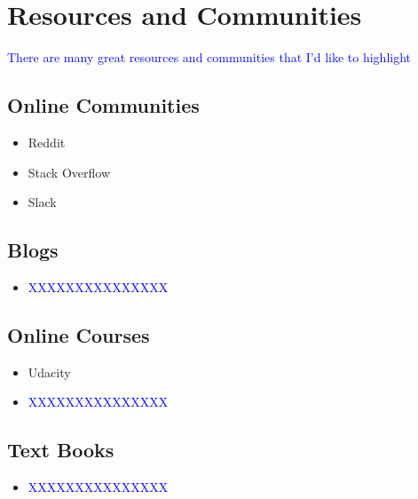 \chapter{Resources and Communities}

\textcolor{blue}{There are many great resources and communities that I'd like to highlight}


\section{Online Communities}

\begin{itemize}
	
	\item Reddit
	
	\item Stack Overflow
	
	\item Slack
\end{itemize}


\section{Blogs}

\begin{itemize}
	
	\item \textcolor{blue}{XXXXXXXXXXXXXXX}
	
\end{itemize}



\section{Online Courses}

\begin{itemize}
	
	\item Udacity
	
	\item \textcolor{blue}{XXXXXXXXXXXXXXX}
	
\end{itemize}


\section{Text Books}

\begin{itemize}
	\item \textcolor{blue}{XXXXXXXXXXXXXXX}
	
\end{itemize}